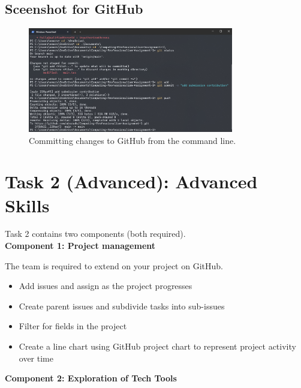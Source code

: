 \documentclass[a4paper, 11pt]{report}
\begin{document}
\newpage

\subsection{Sceenshot for GitHub}
\begin{figure}[h]
    \centering
    \includegraphics[width=0.8\textwidth]{githubpush.png}
    \caption{Committing changes to GitHub from the command line.}
    \label{fig:my_label}
\end{figure}



\newpage
\section{Task 2 (Advanced): Advanced Skills}

Task 2 contains two components (both required).\\[2mm]

\textbf{Component 1: Project management}

The team is required to extend on your project on GitHub.

\begin{itemize}
    \item Add issues and assign as the project progresses
    \item Create parent issues and subdivide tasks into sub-issues
    \item Filter for fields in the project
    \item Create a line chart using GitHub project chart to represent project activity over time
\end{itemize} 

\vspace{4ex}

\textbf{Component 2: Exploration of Tech Tools}
\end{document}
